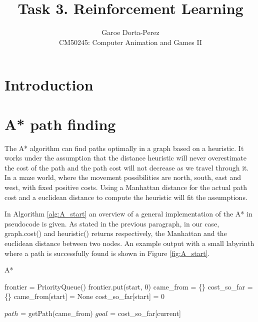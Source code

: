 \documentclass[12pt]{article}
\begin{document}
  
\title{Task 3. Reinforcement Learning}
\author{Garoe Dorta-Perez\\
CM50245: Computer Animation and Games II}
 
\maketitle
 
\section{Introduction}

\section{A* path finding}

The A* algorithm can find paths optimally in a graph based on a heuristic.
It works under the assumption that the distance heuristic will never overestimate the cost of the path and the path cost will not decrease as we travel through it.
In a maze world, where the movement possibilities are north, south, east and west, with fixed positive costs.
Using a Manhattan distance for the actual path cost and a euclidean distance to compute the heuristic will fit the assumptions.

In Algorithm \ref{alg:A_start} an overview of a general implementation of the A* in pseudocode is given.
As stated in the previous paragraph, in our case, graph.cost() and heuristic() returns respectively, the Manhattan and the euclidean distance between two nodes. An example output with a small labyrinth where a path is successfully found is shown in Figure \ref{fig:A_start}.

\begin{algorithm}[htbp!] \label{alg:A_start}
	\caption{A*}
	
	frontier = PriorityQueue()\;
	frontier.put(start, 0)\;
	came\_from = \{\}\;
	cost\_so\_far = \{\}\;
	came\_from[start] = None\;
	cost\_so\_far[start] = 0\;

	$path$ = getPath(came\_from)\;
	$goal$ = cost\_so\_far[current]\;
\end{algorithm}
\end{document}
